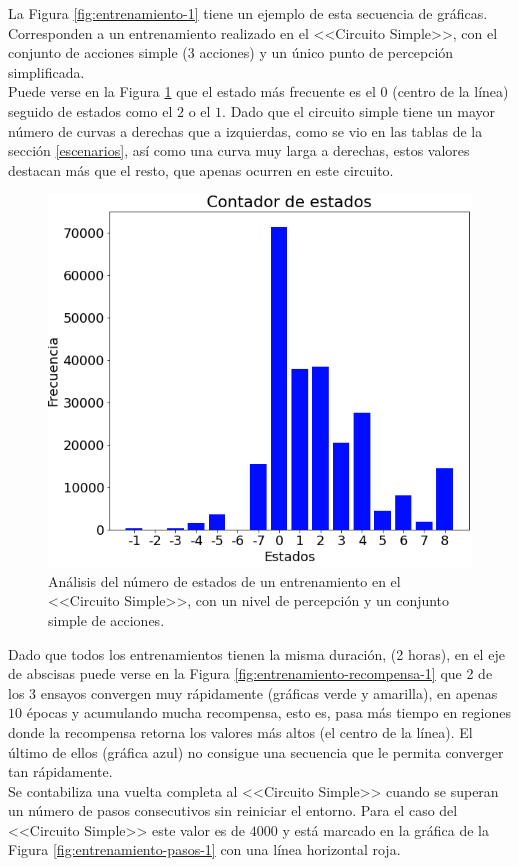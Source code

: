 La Figura \ref{fig:entrenamiento-1} tiene un ejemplo de esta secuencia de gráficas. Corresponden a un entrenamiento realizado en el <<Circuito Simple>>, con el conjunto de acciones simple (3 acciones) y un único punto de percepción simplificada.\\

Puede verse en la Figura \ref{fig:entrenamiento-contador-1} que el estado más frecuente es el $0$ (centro de la línea) seguido de estados como el $2$ o el $1$. Dado que el circuito simple tiene un mayor número de curvas a derechas que a izquierdas, como se vio en las tablas de la sección \ref{escenarios}, así como una curva muy larga a derechas, estos valores destacan más que el resto, que apenas ocurren en este circuito.\\

\begin{figure}[!ht]
    \centering \includegraphics[width=0.6\columnwidth]{./figures/chapter_5/simple_circuit_simple_1.png}
    \caption{Análisis del número de estados de un entrenamiento en el <<Circuito Simple>>, con un nivel de percepción y un conjunto simple de acciones.}\label{fig:entrenamiento-contador-1}
\end{figure}

Dado que todos los entrenamientos tienen la misma duración, (2 horas), en el eje de abscisas puede verse en la Figura \ref{fig:entrenamiento-recompensa-1} que 2 de los 3 ensayos convergen muy rápidamente (gráficas verde y amarilla), en apenas $10$ épocas y acumulando mucha recompensa, esto es, pasa más tiempo en regiones donde la recompensa retorna los valores más altos (el centro de la línea). El último de ellos (gráfica azul) no consigue una secuencia que le permita converger tan rápidamente.\\

Se contabiliza una vuelta completa al <<Circuito Simple>> cuando se superan un número de pasos consecutivos sin reiniciar el entorno. Para el caso del <<Circuito Simple>> este valor es de $4000$ y está marcado en la gráfica de la Figura \ref{fig:entrenamiento-pasos-1} con una línea horizontal roja.\\

